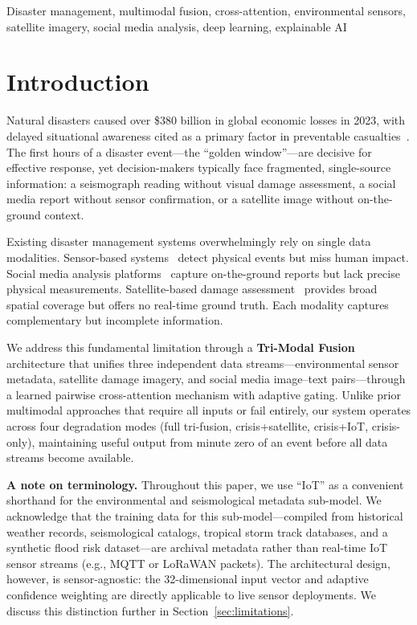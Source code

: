 \documentclass[journal]{IEEEtran}
\begin{document}
\begin{IEEEkeywords}
Disaster management, multimodal fusion, cross-attention, environmental sensors, satellite imagery, social media analysis, deep learning, explainable AI
\end{IEEEkeywords}

\section{Introduction}

Natural disasters caused over \$380 billion in global economic losses in 2023, with delayed situational awareness cited as a primary factor in preventable casualties~\cite{cred2023}. The first hours of a disaster event---the ``golden window''---are decisive for effective response, yet decision-makers typically face fragmented, single-source information: a seismograph reading without visual damage assessment, a social media report without sensor confirmation, or a satellite image without on-the-ground context.

Existing disaster management systems overwhelmingly rely on single data modalities. Sensor-based systems~\cite{sakaki2010earthquake} detect physical events but miss human impact. Social media analysis platforms~\cite{alam2018crisismmd,imran2015processing} capture on-the-ground reports but lack precise physical measurements. Satellite-based damage assessment~\cite{gupta2019xbd} provides broad spatial coverage but offers no real-time ground truth. Each modality captures complementary but incomplete information.

We address this fundamental limitation through a \textbf{Tri-Modal Fusion} architecture that unifies three independent data streams---environmental sensor metadata, satellite damage imagery, and social media image--text pairs---through a learned pairwise cross-attention mechanism with adaptive gating. Unlike prior multimodal approaches that require all inputs or fail entirely, our system operates across four degradation modes (full tri-fusion, crisis+satellite, crisis+IoT, crisis-only), maintaining useful output from minute zero of an event before all data streams become available.

\textbf{A note on terminology.} Throughout this paper, we use ``IoT'' as a convenient shorthand for the environmental and seismological metadata sub-model. We acknowledge that the training data for this sub-model---compiled from historical weather records, seismological catalogs, tropical storm track databases, and a synthetic flood risk dataset---are archival metadata rather than real-time IoT sensor streams (e.g., MQTT or LoRaWAN packets). The architectural design, however, is sensor-agnostic: the 32-dimensional input vector and adaptive confidence weighting are directly applicable to live sensor deployments. We discuss this distinction further in Section~\ref{sec:limitations}.
\end{document}
